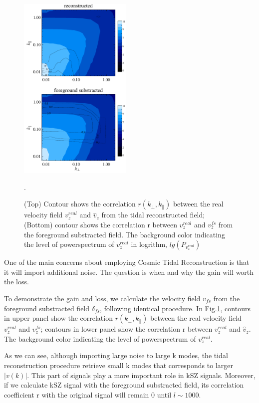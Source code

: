 \begin{figure}[tbp]
	\begin{center}
		\includegraphics[width=0.48\textwidth]{vmode.pdf}
	\end{center}
	\vspace{-0.7cm}
	\caption{(Top) Contour shows the correlation $r(k_\perp,k_\parallel)$ between the real velocity field $v_z^{real}$ and $\hat v_z$ from the tidal reconstructed field; 
(Bottom) contour shows the correlation r between $v_z^{real}$ and $v_z^{fs}$ from the foreground substracted field. 
The background color indicating the level of powerspectrum of $v_z^{real}$ in logrithm, $lg(P_{v_z^{real}})$}. 
\label{fig:vmode}
\end{figure}

One of the main concerns about employing Cosmic Tidal Reconstruction is that it will import additional noise.
The question is when and why the gain will worth the loss.

To demonstrate the gain and loss, we calculate the velocity field $v_{fs}$
from the foreground substracted field $\delta_{fs}$, following identical procedure.
In Fig.\ref{fig:vmode}, contours in upper panel show the 
correlation $r(k_\perp,k_\parallel)$ between the real velocity field $v_z^{real}$ and $v_z^{fs}$; 
contours in lower panel show the
correlation r between $v_z^{real}$ and $\hat v_z$. The background color indicating the level of powerspectrum of $v_z^{real}$. 

As we can see, although importing large noise to large k modes, 
the tidal reconstruction procedure retrieve small k modes that corresponds to larger $|v(k)|$. This part of signals play a more important role in kSZ signals.
Moreover, if we calculate kSZ signal with the foreground substracted field, its correlation coefficient r with the original signal will remain 0 until $l\sim1000$.

